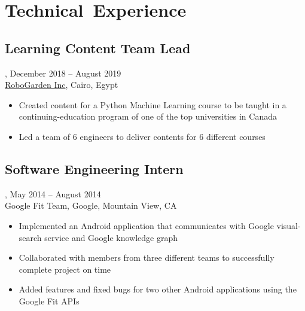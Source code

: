 \section{Technical~Experience}
\subsection{Learning Content Team Lead}, December 2018 -- August 2019\\
\href{https://robogarden.ca}{RoboGarden Inc}, Cairo, Egypt
\begin{itemize}
    \item Created content for a Python Machine Learning course to be taught in a continuing-education program of one of the top universities in Canada
    \item Led a team of 6 engineers to deliver contents for 6 different courses
\end{itemize}

\subsection{Software Engineering Intern}, May 2014 -- August 2014\\
Google Fit Team, Google, Mountain View, CA
\begin{itemize}
\item Implemented an Android application that communicates with Google visual-search service and Google knowledge graph
\item Collaborated with members from three different teams to successfully complete project on time
\item Added features and fixed bugs for two other Android applications using the Google Fit APIs
\end{itemize}
